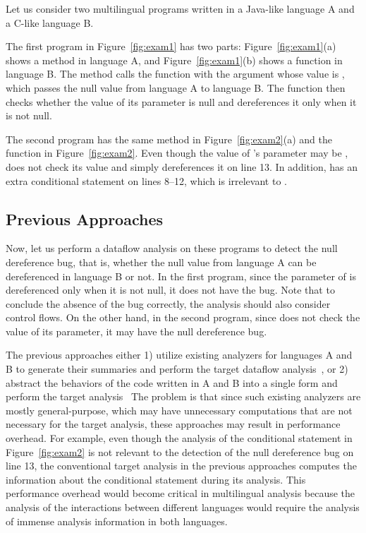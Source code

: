 Let us consider two multilingual programs written in a Java-like language A
and a C-like language B.

The first program in Figure~\ref{fig:exam1} has two parts:
Figure~\ref{fig:exam1}(a) shows a method  in language A,
and Figure~\ref{fig:exam1}(b) shows a function  in language B.
The method  calls the function  with the argument
 whose value is , which passes the null
value from language A to language B. The function  then
checks whether the value of its parameter  is null
and dereferences it only when it is not null.

The second program has the same method in Figure~\ref{fig:exam2}(a)
and the function  in Figure~\ref{fig:exam2}.
Even though the value of 's parameter  may be ,
 does not check its value and simply dereferences it on line 13.
In addition,  has an extra conditional statement on lines 8--12,
which is irrelevant to .

\subsection{Previous Approaches}
Now, let us perform a dataflow analysis on these programs to detect
the null dereference bug, that is, whether the null value from
language A can be dereferenced in language B or not.
In the first program, since the parameter of  is
dereferenced only when it is not null, it does not have the bug.
Note that to conclude the absence of the bug correctly,
the analysis should also consider control flows.
On the other hand, in the second program, since  does not
check the value of its parameter, it may have the null dereference bug.

The previous approaches either 1) utilize existing analyzers for
languages A and B to generate their summaries and perform the
target dataflow analysis~\cite{LeeASE20,JN-SAF}, or 2) abstract 
the behaviors of the code written in A and B into a single form and
perform the target analysis~\cite{hybridroid,cpython}
The problem is that since such existing analyzers are mostly general-purpose,
which may have unnecessary computations that are not necessary for the target analysis,
these approaches may result in performance overhead.
For example, even though the analysis of the conditional statement in Figure~\ref{fig:exam2}
is not relevant to the detection of the null dereference bug on line 13,
the conventional target analysis in the previous approaches computes
the information about the conditional statement during its analysis.
This performance overhead would become critical in multilingual analysis
because the analysis of the interactions between different languages would require
the analysis of immense analysis information in both languages.


